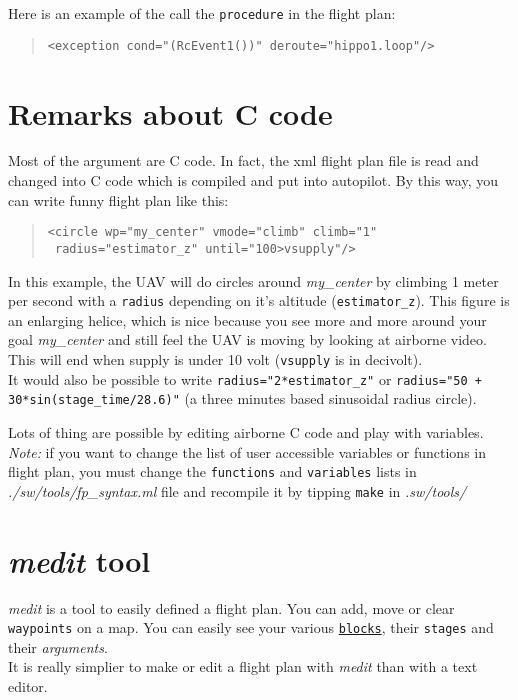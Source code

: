 \documentclass{article}
\renewcommand{\tt}[1]{\texttt{#1}}
\newcommand{\ex}[1]{\colorbox[gray]{0.92}{\tt{#1}}}
\newcommand{\hs}[1]{\hspace*{#1cm}}
\newcommand{\qt}[1]{\textcolor{gris75}{#1}}
\begin{document}
\begin{minipage}[ctb]{\textwidth}
Here is an example of the call the \tt{procedure} in the flight plan:
\begin{quote}
	\ex{<exception cond="\qt{(RcEvent1())}" deroute="\qt{hippo1.loop}"/>} \\
\end{quote}
\end{minipage}


\hypertarget{Ccode}{\section{Remarks about C code}}
\label{Ccode2}
Most of the argument are C code. In fact, the xml flight plan file is read and
changed into C code which is compiled and put into autopilot. By this way, you
can write funny flight plan like this:
\begin{quote}
	\ex{<circle wp="\qt{my\_center}" vmode="\qt{climb}" climb="\qt{1}"} \\
	\ex{\hs{1.3} radius="\qt{estimator\_z}" until="\qt{100>vsupply}"/>}
\end{quote}

In this example, the UAV will do circles around \emph{my\_center} by climbing
1 meter per second with a \tt{radius} depending on it's altitude
(\tt{estimator\_z}). This figure is an enlarging helice, which is nice because
you see more and more around your goal \emph{my\_center} and still feel the UAV
is moving by looking at airborne video.
This will end when supply is under 10 volt (\tt{vsupply} is in decivolt). \\

It would also be possible to write
\ex{radius="\qt{2*estimator\_z}"} or
\ex{radius="\qt{50 + 30*sin(stage\_time/28.6)}"} (a three minutes based
sinusoidal radius circle).

Lots of thing are possible by editing airborne C code and play with variables. \\

\emph{Note:} if you want to change the list of user accessible variables or
functions in flight plan, you must change the \tt{functions} and
\tt{variables} lists in \emph{./sw/tools/fp\_syntax.ml} file and
recompile it by tipping \tt{make} in \emph{.sw/tools/}


\hypertarget{medit}{\section{\emph{medit} tool}}
\label{medit2}

\emph{medit} is a tool to easily defined a flight plan. You can add, move or
clear \tt{waypoints} on a map. You can easily see your various
\hyperlink{blocks}{\tt{blocks}}, their \tt{stages} and their \emph{arguments}.\\
It is really simplier to make or edit a flight plan with \emph{medit} than
with a text editor.
\end{document}
